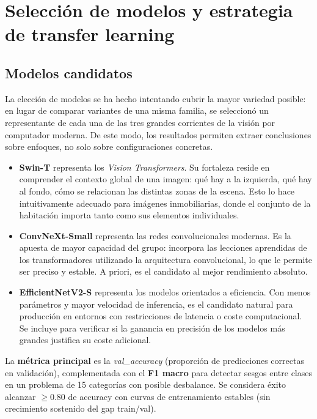 \section{Selección de modelos y estrategia de transfer learning}

\subsection{Modelos candidatos}

La elección de modelos se ha hecho intentando cubrir la mayor variedad posible: en lugar de comparar variantes de una misma familia, se seleccionó un representante de cada una de las tres grandes corrientes de la visión por computador moderna. De este modo, los resultados permiten extraer conclusiones sobre enfoques, no solo sobre configuraciones concretas.

\begin{itemize}\setlength\itemsep{2pt}
    \item \textbf{Swin-T} representa los \textit{Vision Transformers}. Su fortaleza reside en comprender el contexto global de una imagen: qué hay a la izquierda, qué hay al fondo, cómo se relacionan las distintas zonas de la escena. Esto lo hace intuitivamente adecuado para imágenes inmobiliarias, donde el conjunto de la habitación importa tanto como sus elementos individuales.
    \item \textbf{ConvNeXt-Small} representa las redes convolucionales modernas. Es la apuesta de mayor capacidad del grupo: incorpora las lecciones aprendidas de los transformadores utilizando la arquitectura convolucional, lo que le permite ser preciso y estable. A priori, es el candidato al mejor rendimiento absoluto.
    \item \textbf{EfficientNetV2-S} representa los modelos orientados a eficiencia. Con menos parámetros y mayor velocidad de inferencia, es el candidato natural para producción en entornos con restricciones de latencia o coste computacional. Se incluye para verificar si la ganancia en precisión de los modelos más grandes justifica su coste adicional.
\end{itemize}

La \textbf{métrica principal} es la \textit{val\_accuracy} (proporción de predicciones correctas en validación), complementada con el \textbf{F1 macro} para detectar sesgos entre clases en un problema de 15 categorías con posible desbalance. Se considera éxito alcanzar $\geq 0.80$ de accuracy con curvas de entrenamiento estables (sin crecimiento sostenido del gap train/val).

